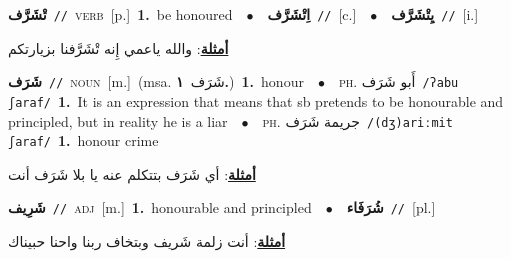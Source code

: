 \documentclass[10pt,a4paper,twoside]{article} %
\begin{document}
\begin{multicols}{2}
{\setlength\topsep{0pt}\textbf{\foreignlanguage{arabic}{تْشَرَّف}}\ {\color{gray}\texttt{//}\color{black}}\ \textsc{verb}\ [p.]\ \textbf{1.}~be honoured\ \ $\bullet$\ \ \setlength\topsep{0pt}\textbf{\foreignlanguage{arabic}{اِتْشَرَّف}}\ {\color{gray}\texttt{//}\color{black}}\ [c.]\ \ $\bullet$\ \ \setlength\topsep{0pt}\textbf{\foreignlanguage{arabic}{يِتْشَرَّف}}\ {\color{gray}\texttt{//}\color{black}}\ [i.]\  \begin{flushright}\color{gray}\foreignlanguage{arabic}{\textbf{\underline{\foreignlanguage{arabic}{أمثلة}}}: والله ياعمي إِنه تْشَرَّفنا بزيارتكم}\end{flushright}\color{black}} \vspace{2mm}

{\setlength\topsep{0pt}\textbf{\foreignlanguage{arabic}{شَرَف}}\ {\color{gray}\texttt{//}\color{black}}\ \textsc{noun}\ [m.]\ \color{gray}(msa. \foreignlanguage{arabic}{شَرَف}~\foreignlanguage{arabic}{\textbf{١.}})\color{black}\ \textbf{1.}~honour\ \ $\bullet$\ \ \textsc{ph.} \color{gray} \foreignlanguage{arabic}{أَبو شَرَف}\color{black}\ {\color{gray}\texttt{/{\sffamily ʔabu ʃaraf}/}\color{black}}\ \textbf{1.}~It is an expression that means that sb pretends to be honourable and principled, but in reality he is a liar\ \ $\bullet$\ \ \textsc{ph.} \color{gray} \foreignlanguage{arabic}{جريمة شَرَف}\color{black}\ {\color{gray}\texttt{/{\sffamily (dʒ)ariːmit ʃaraf}/}\color{black}}\ \textbf{1.}~honour crime\  \begin{flushright}\color{gray}\foreignlanguage{arabic}{\textbf{\underline{\foreignlanguage{arabic}{أمثلة}}}: أي شَرَف بتتكلم عنه يا بلا شَرَف أنت}\end{flushright}\color{black}} \vspace{2mm}

{\setlength\topsep{0pt}\textbf{\foreignlanguage{arabic}{شَرِيف}}\ {\color{gray}\texttt{//}\color{black}}\ \textsc{adj}\ [m.]\ \textbf{1.}~honourable and principled\ \ $\bullet$\ \ \setlength\topsep{0pt}\textbf{\foreignlanguage{arabic}{شُرَفَاء}}\ {\color{gray}\texttt{//}\color{black}}\ [pl.]\  \begin{flushright}\color{gray}\foreignlanguage{arabic}{\textbf{\underline{\foreignlanguage{arabic}{أمثلة}}}: أنت زلمة شَريف وبتخاف ربنا واحنا حبيناك}\end{flushright}\color{black}} \vspace{2mm}


\end{multicols}
\end{document}
